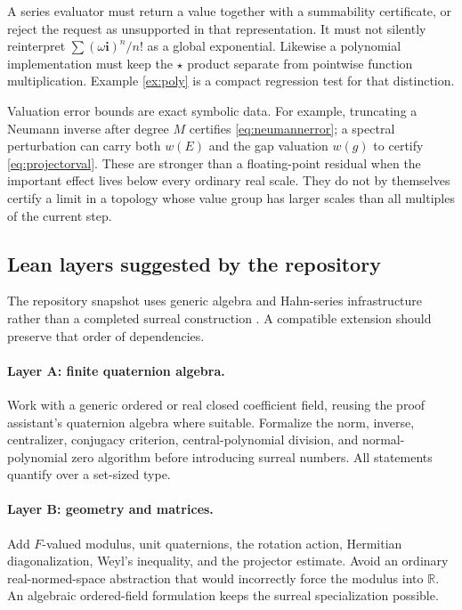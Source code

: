 \documentclass[11pt,letterpaper]{article}
\numberwithin{equation}{section}
\theoremstyle{definition}
\theoremstyle{remark}
\newcommand{\R}{\mathbb R}
\newcommand{\ii}{\mathbf i}
\begin{document}
A series evaluator must return a value together with a summability certificate, or reject the
request as unsupported in that representation. It must not silently reinterpret
$\sum(\omega\ii)^n/n!$ as a global exponential. Likewise a polynomial implementation must
keep the $\star$ product separate from pointwise function multiplication. Example
\ref{ex:poly} is a compact regression test for that distinction.

Valuation error bounds are exact symbolic data. For example, truncating a Neumann inverse
after degree $M$ certifies \eqref{eq:neumannerror}; a spectral perturbation can carry both
$w(E)$ and the gap valuation $w(g)$ to certify \eqref{eq:projectorval}. These are stronger
than a floating-point residual when the important effect lives below every ordinary real
scale. They do not by themselves certify a limit in a topology whose value group has larger
scales than all multiples of the current step.

\subsection{Lean layers suggested by the repository}
The repository snapshot uses generic algebra and Hahn-series infrastructure rather than a
completed surreal construction \cite{Repo}. A compatible extension should preserve that
order of dependencies.

\paragraph{Layer A: finite quaternion algebra.}
Work with a generic ordered or real closed coefficient field, reusing the proof assistant's
quaternion algebra where suitable. Formalize the norm, inverse, centralizer, conjugacy
criterion, central-polynomial division, and normal-polynomial zero algorithm before introducing
surreal numbers. All statements quantify over a set-sized type.

\paragraph{Layer B: geometry and matrices.}
Add $F$-valued modulus, unit quaternions, the rotation action, Hermitian diagonalization,
Weyl's inequality, and the projector estimate. Avoid an ordinary real-normed-space abstraction
that would incorrectly force the modulus into $\R$. An algebraic ordered-field formulation
keeps the surreal specialization possible.
\end{document}
